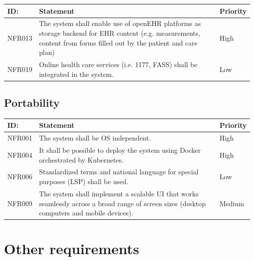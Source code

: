 \documentclass{scrreprt}
\begin{document}
\begin{center}
\begin{tabularx}{\linewidth}{| l | X | l |}
\hline
\textbf{ID:} & \textbf{Statement} & \textbf{Priority} \\
\hline
NFR013 & 
The system shall enable use of openEHR platforms as storage backend for EHR content (e.g. measurements, content from forms filled out by the patient and care plan) &
High \\ 
\hline
NFR019 & 
Online health care services (i.e. 1177, FASS) shall be integrated in the system. & 
Low \\ 
\hline
\end{tabularx}
\end{center}

\subsection{Portability}

\begin{center}
\begin{tabularx}{\linewidth}{| l | X | l |}
\hline
\textbf{ID:} & \textbf{Statement} & \textbf{Priority} \\
\hline
NFR001 & 
The system shall be OS independent. &
High \\ 
\hline
NFR004 & 
It shall be possible to deploy the system using Docker orchestrated by Kubernetes.&
High \\ 
\hline
NFR006 & 
Standardized terms and national language for special purposes (LSP) shall be used. &
Low \\ 
\hline
NFR009 & 
The system shall implement a scalable UI that works seamlessly across a broad range of screen sizes (desktop computers and mobile devices). &
Medium \\ 
\hline
\end{tabularx}
\end{center}


\section{Other requirements}
\end{document}
